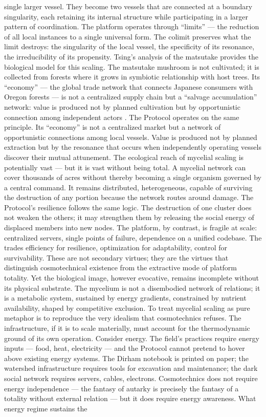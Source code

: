 single larger vessel. They become two vessels that are connected at a boundary singularity, each retaining its internal structure while participating in a larger pattern of coordination. The platform operates through “limits” — the reduction of all local instances to a single universal form. The colimit preserves what the limit destroys: the singularity of the local vessel, the specificity of its resonance, the irreducibility of its propensity. Tsing’s analysis of the matsutake provides the biological model for this scaling. The matsutake mushroom is not cultivated; it is collected from forests where it grows in symbiotic relationship with host trees. Its “economy” — the global trade network that connects Japanese consumers with Oregon forests — is not a centralized supply chain but a “salvage accumulation” network: value is produced not by planned cultivation but by opportunistic connection among independent actors \cite{tsing_2015}. The  Protocol operates on the same principle. Its “economy” is not a centralized market but a network of opportunistic connections among local vessels. Value is produced not by planned extraction but by the resonance that occurs when independently operating vessels discover their mutual attunement. The ecological reach of mycelial scaling is potentially vast — but it is vast without being total. A mycelial network can cover thousands of acres without thereby becoming a single organism governed by a central command. It remains distributed, heterogeneous, capable of surviving the destruction of any portion because the network routes around damage. The  Protocol’s resilience follows the same logic. The destruction of one cluster does not weaken the others; it may strengthen them by releasing the social energy of displaced members into new nodes. The platform, by contrast, is fragile at scale: centralized servers, single points of failure, dependence on a unified codebase. The  trades efficiency for resilience, optimization for adaptability, control for survivability. These are not secondary virtues; they are the virtues that distinguish cosmotechnical existence from the extractive mode of platform totality. Yet the biological image, however evocative, remains incomplete without its physical substrate. The mycelium is not a disembodied network of relations; it is a metabolic system, sustained by energy gradients, constrained by nutrient availability, shaped by competitive exclusion. To treat mycelial scaling as pure metaphor is to reproduce the very idealism that cosmotechnics refuses. The  infrastructure, if it is to scale materially, must account for the thermodynamic ground of its own operation. Consider energy. The field’s practices require energy inputs — food, heat, electricity — and the  Protocol cannot pretend to hover above existing energy systems. The Dirham notebook is printed on paper; the watershed infrastructure requires tools for excavation and maintenance; the dark social network requires servers, cables, electrons. Cosmotechnics does not require energy independence — the fantasy of autarky is precisely the fantasy of a totality without external relation — but it does require energy awareness. What energy regime sustains the  